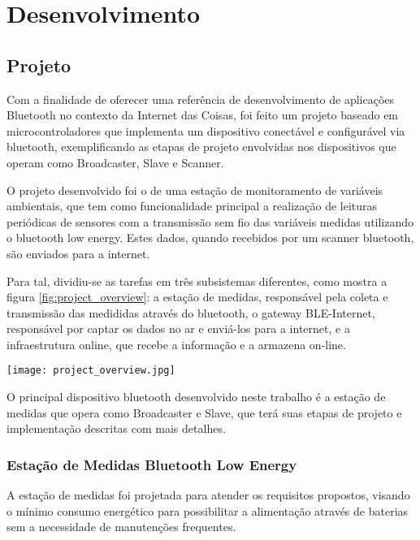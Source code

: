 \section{Desenvolvimento}

\subsection{Projeto}
\label{subsection:projeto}
Com a finalidade de oferecer uma referência de desenvolvimento de aplicações
Bluetooth no contexto da Internet das Coisas, foi feito um projeto baseado em
microcontroladores que implementa um dispositivo conectável e configurável via
bluetooth, exemplificando as etapas de projeto envolvidas nos dispositivos que
operam como Broadcaster, Slave e Scanner.

O projeto desenvolvido foi o de uma estação de monitoramento de variáveis
ambientais, que tem como funcionalidade principal a realização de leituras
periódicas de sensores com a transmissão sem fio das variáveis medidas
utilizando o bluetooth low energy. Estes dados, quando recebidos por um scanner
bluetooth, são enviados para a internet.

Para tal, dividiu-se as tarefas em três subsistemas diferentes, como mostra a
figura \ref{fig:project_overview}:
a estação de medidas, responsável pela coleta e transmissão das medididas através do
bluetooth, o gateway BLE-Internet, responsável por captar os dados no ar e
enviá-los para a internet, e a infraestrutura online, que recebe a informação e
a armazena on-line.

\begin{center}
	\centering 
	\texttt{[image: project\_overview.jpg]}
	\label{fig:project_overview}
\end{center} 

O principal dispositivo bluetooth desenvolvido neste trabalho é a estação de
medidas que opera como Broadcaster e Slave, que terá suas etapas de projeto e
implementação descritas com mais detalhes.

\subsubsection{Estação de Medidas Bluetooth Low Energy}

A estação de medidas foi projetada para atender os requisitos propostos,
visando o mínimo consumo energético para possibilitar a alimentação através de
baterias sem a necessidade de manutenções frequentes.

